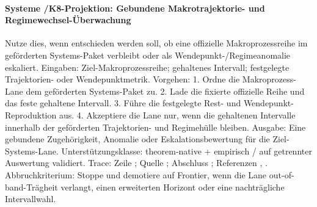\paragraph{Systeme /\allowbreak K8-Projektion: Gebundene Makrotrajektorie- und Regimewechsel-Überwachung}
Nutze dies, wenn entschieden werden soll, ob eine offizielle Makroprozessreihe im geförderten Systems-Paket verbleibt oder als Wendepunkt-/Regimeanomalie eskaliert.
Eingaben: Ziel-Makroprozessreihe; \allowbreak gehaltenes Intervall; \allowbreak festgelegte Trajektorien- oder Wendepunktmetrik.
Vorgehen: 1. Ordne die Makroprozess-Lane dem geförderten Systems-Paket zu. 2. Lade die fixierte offizielle Reihe und das feste gehaltene Intervall. 3. Führe die festgelegte Rest- und Wendepunkt-Reproduktion aus. 4. Akzeptiere die Lane nur, wenn die gehaltenen Intervalle innerhalb der geförderten Trajektorien- und Regimehülle bleiben.
Ausgabe: Eine gebundene Zugehörigkeit, Anomalie oder Eskalationsbewertung für die Ziel-Systems-Lane.
Unterstützungsklasse: theorem-native + empirisch / auf getrennter Auswertung validiert.
Trace: Zeile ; \allowbreak Quelle ; \allowbreak Abschluss ; \allowbreak Referenzen , \allowbreak {}.
Abbruchkriterium: Stoppe und demotiere auf Frontier, wenn die Lane out-of-band-Trägheit verlangt, einen erweiterten Horizont oder eine nachträgliche Intervallwahl.

